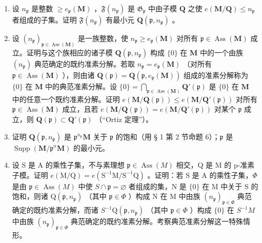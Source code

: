 \begin{enumerate}
\def\labelenumi{(\alph{enumi})}
\item
  设 \(n_{\mathfrak{p}}\) 是整数 \(\geqslant e_{\mathfrak{p}}(\mathbf{M})\) ，\(\mathfrak{F}(n_{\mathfrak{p}})\) 是 \(\mathfrak{G}_{\mathfrak{p}}\) 中由子模 \(\mathbf{Q}\) 之使 \(e(\mathbf{M} / \mathbf{Q}) \leqslant n_{\mathfrak{p}}\) 者组成的子集。证明 \(\mathfrak{F}(n_{\mathfrak{p}})\) 有最小元 \(\mathbf{Q}(\mathfrak{p}, n_{\mathfrak{p}})\) 。
\item
  设 \((n_{\mathfrak{p}})_{\mathfrak{p} \in \operatorname{Ass}(\mathbf{M})}\) 是一族整数，使 \(n_{\mathfrak{p}} \geqslant e_{\mathfrak{p}}(\mathbf{M})\) 对所有 \(\mathfrak{p} \in \operatorname{Ass}(\mathbf{M})\) 成立。证明与这个族相应的诸子模 \(\mathbf{Q}(\mathfrak{p}, n_{\mathfrak{p}})\) 构成 \(\{0\}\) 在 \(\mathbf{M}\) 中的一个由族 \((n_{\mathfrak{p}})\) 典范确定的既约准素分解。若取 \(n_{\mathfrak{p}} = e_{\mathfrak{p}}(\mathbf{M})\) （对所有 \(\mathfrak{p} \in \operatorname{Ass}(\mathbf{M})\) ），则由诸 \(\mathbf{Q}(\mathfrak{p}) = \mathbf{Q}(\mathfrak{p}, e_{\mathfrak{p}}(\mathbf{M}))\) 组成的准素分解称为 \(\{0\}\) 在 \(\mathbf{M}\) 中的典范准素分解。设 \(\{0\} = \bigcap_{\mathfrak{p} \in \operatorname{Ass}(\mathbf{M})} \mathbf{Q}'(\mathfrak{p})\) 是 \(\{0\}\) 在 \(\mathbf{M}\) 中的任意一个既约准素分解。证明 \(e(\mathbf{M}/\mathbf{Q}(\mathfrak{p})) \leqslant e(\mathbf{M}/\mathbf{Q}'(\mathfrak{p}))\) 对所有 \(\mathfrak{p} \in \operatorname{Ass}(\mathbf{M})\) 成立，且若 \(e(\mathbf{M}/\mathbf{Q}(\mathfrak{p})) = e(\mathbf{M}/\mathbf{Q}'(\mathfrak{p}))\) 对某个 \(\mathfrak{p}\) 成立，则 \(\mathbf{Q}(\mathfrak{p}) \subset \mathbf{Q}'(\mathfrak{p})\) （``Ortiz 定理''）。
\item
  证明 \(\mathbf{Q}(\mathfrak{p}, n_{\mathfrak{p}})\) 是 \(\mathfrak{p}^{n_{\mathfrak{p}}} \mathbf{M}\) 关于 \(\mathfrak{p}\) 的饱和（用 § 1 第 2 节命题 6）；\(\mathfrak{p}\) 是 \(\operatorname{Supp}(\mathbf{M} / \mathfrak{p}^n\mathbf{M})\) 的最小元。
\item
  设 S 是 A 的乘性子集，不与素理想 \(\mathfrak{p} \in \operatorname{Ass}(M)\) 相交，Q 是 M 的 p-准素子模。证明 \(e(\mathrm{M}/\mathrm{Q}) = e(\mathrm{S}^{-1}\mathrm{M}/\mathrm{S}^{-1}\mathrm{Q})\) 。证明：若 S 是 A 的乘性子集，\(\Phi\) 是由 \(\mathfrak{p} \in \operatorname{Ass}(M)\) 中使 \(S \cap \mathfrak{p} = \varnothing\) 者组成的集，N 是 \(\{0\}\) 在 M 中关于 S 的饱和，则诸 \(\mathrm{Q}(\mathfrak{p}, n_{\mathfrak{p}})\) （其中 \(\mathfrak{p} \in \Phi\) ）构成 N 在 M 中由族 \((n_{\mathfrak{p}})_{\mathfrak{p} \in \Phi}\) 典范确定的既约准素分解，而诸 \(S^{-1}\mathrm{Q}(\mathfrak{p}, n_{\mathfrak{p}})\) （其中 \(\mathfrak{p} \in \Phi\) ）构成 \(\{0\}\) 在 \(S^{-1}M\) 中由族 \((n_{\mathfrak{p}})_{\mathfrak{p} \in \Phi}\) 典范确定的既约准素分解。考察典范准素分解这一特殊情形。
\end{enumerate}

